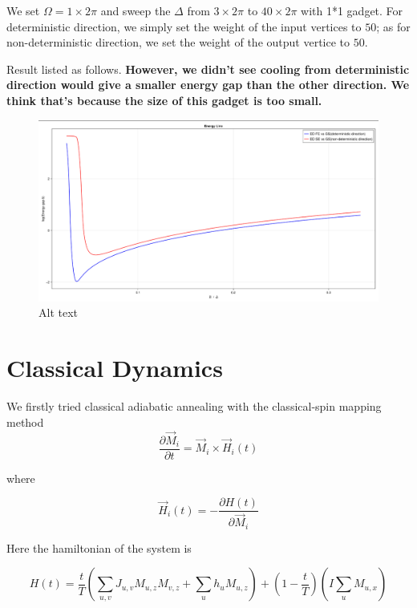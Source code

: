 \documentclass[twocolumn,superscriptaddress,english,showpacs,longbibliography]{revtex4-2}
\begin{document}
We set $\Omega = 1 \times 2\pi$ and sweep the $\Delta$ from $3
\times 2\pi$ to $40 \times 2\pi$ with 1*1 gadget. For deterministic
direction, we simply set the weight of the input vertices to $50$; as
for non-deterministic direction, we set the weight of the output vertice
to $50$.

Result listed as follows. \textbf{However, we didn't see cooling from
deterministic direction would give a smaller energy gap than the other
direction. We think that's because the size of this gadget is too
small.}

\begin{figure}
\centering
\includegraphics[width=\columnwidth]{../notes/images/energy_gap_1_gadget.png}
\caption{Alt text}
\end{figure}

\section{Classical Dynamics}\label{classical-dynamics-1}
We firstly tried classical adiabatic annealing with the classical-spin
mapping method~\cite{Wang2013}
\begin{equation}
\frac{\partial \vec M_i}{\partial t} = \vec M_{i} \times \vec H_{i}(t)
\end{equation}

where

\begin{equation}
\vec H_i(t) = -\frac{\partial H(t)}{\partial \vec M_i} 
\end{equation}

Here the hamiltonian of the system is

\begin{equation}
H(t) = \frac{t}{T}(\sum_{u,v}J_{u,v} M_{u,z}M_{v,z} + \sum_{u} h_u M_{u, z}) + (1-\frac{t}{T})(I\sum_{u}M_{u,x})
\end{equation}
\end{document}
